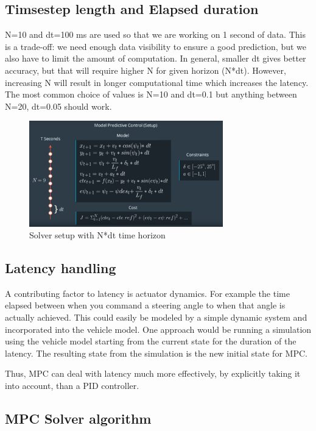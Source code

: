 \documentclass[11pt]{article}
\begin{document}
\subsection{Timsestep length and Elapsed duration}

N=10 and dt=100 ms are used so that we are working on 1 second of data.
This is a trade-off: we need enough data visibility to ensure a good prediction, but we also have to limit the amount of computation.
In general, smaller dt gives better accuracy, but that will require higher N for given horizon (N*dt). However, increasing N will result in longer computational time which increases the latency. The most common choice of values is N=10 and dt=0.1 but anything between N=20, dt=0.05 should work.

\begin{figure}[h]
    \centering
    \includegraphics[width=0.75\textwidth]{solver_setup}
    \caption{Solver setup with N*dt time horizon}
    \label{fig:solver_setup}
\end{figure}

\subsection{Latency handling}


A contributing factor to latency is actuator dynamics. For example the time elapsed between when you command a steering angle to when that angle is actually achieved. This could easily be modeled by a simple dynamic system and incorporated into the vehicle model. One approach would be running a simulation using the vehicle model starting from the current state for the duration of the latency. The resulting state from the simulation is the new initial state for MPC.

Thus, MPC can deal with latency much more effectively, by explicitly taking it into account, than a PID controller.

\subsection{MPC Solver algorithm}
\end{document}
